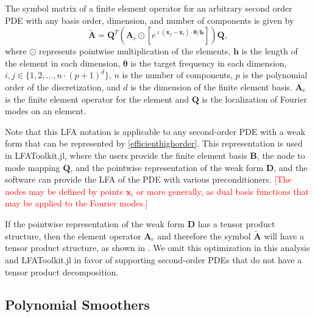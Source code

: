 \documentclass[review]{siamart190516}
\newcommand{\todo}[1]{\textcolor{red}{[#1]}}
\begin{document}
\begin{definition}\label{def:high_order_symbol}
The symbol matrix of a finite element operator for an arbitrary second order PDE with any basis order, dimension, and number of components is given by
\begin{equation}\label{symbolhighorder}
\tilde{\mathbf{A}} = \mathbf{Q}^T \left( \mathbf{A}_e \odot \left[ e^{\imath \left( \mathbf{x}_j - \mathbf{x}_i \right) \cdot \boldsymbol{\theta} / \mathbf{h}} \right] \right) \mathbf{Q},
\end{equation}
where $\odot$ represents pointwise multiplication of the elements, $\mathbf{h}$ is the length of the element in each dimension, $\boldsymbol{\theta}$ is the target frequency in each dimension, $i, j \in \lbrace 1, 2, \dots, n \cdot \left( p + 1 \right)^d \rbrace$, $n$ is the number of components, $p$ is the polynomial order of the discretization, and $d$ is the dimension of the finite element basis.
$\mathbf{A}_e$ is the finite element operator for the element and $\mathbf{Q}$ is the localization of Fourier modes on an element.
\end{definition}

Note that this LFA notation is applicable to any second-order PDE with a weak form that can be represented by \cref{efficienthighorder}.
This representation is used in LFAToolkit.jl, where the users provide the finite element basis $\mathbf{B}$, the node to mode mapping $\mathbf{Q}$, and the pointwise representation of the weak form $\mathbf{D}$, and the software can provide the LFA of the PDE with various preconditioners.
\todo{The nodes may be defined by points $\mathbf x_i$ or more generally, as dual basis functions that may be applied to the Fourier modes.}

If the pointwise representation of the weak form $\mathbf{D}$ has a tensor product structure, then the element operator $\mathbf{A}_e$ and therefore the symbol $\tilde{\mathbf{A}}$ will have a tensor product structure, as shown in \cite{he2020two}.
We omit this optimization in this analysis and LFAToolkit.jl in favor of supporting second-order PDEs that do not have a tensor product decomposition.

\subsection{Polynomial Smoothers}\label{sec:smooth}
\end{document}
